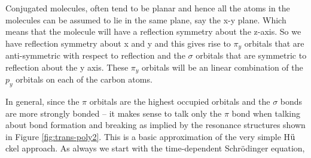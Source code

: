 \documentclass[9pt,twocolumn,twoside]{optica}
\begin{document}
Conjugated molecules, often tend to be planar and hence all the atoms in the molecules can be assumed to lie in the same plane, say the x-y plane. Which means that the molecule will have a reflection symmetry about the z-axis. So we have reflection symmetry about x and y and this gives rise to $\pi_y$ orbitals that are anti-symmetric with respect to reflection and the $\sigma$ orbitals that are symmetric to reflection about the y axis. These $\pi_y$ orbitals will be an linear combination of the $p_y$
orbitals on each of the carbon atoms. 

In general, since the $\pi$ orbitals are the highest occupied orbitals and the $\sigma$ bonds are more strongly bonded -- it makes sense to talk only the $\pi$ bond when talking about bond formation and breaking as implied by the resonance structures shown in Figure \ref{fig:trans-poly2}.  This is a basic approximation of the very simple H$\ddot{\text u}$ckel approach. As always we start with the time-dependent Schrödinger equation,
\end{document}
